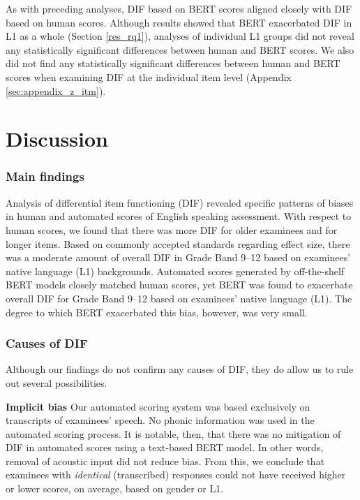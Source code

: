 \documentclass [PhD] {uclathes}
\begin{document}
As with preceding analyses, DIF based on BERT scores aligned closely with DIF based on human scores. Although results showed that BERT exacerbated DIF in L1 as a whole (Section \ref{res_rq1}), analyses of individual L1 groups did not reveal any statistically significant differences between human and BERT scores. We also did not find any statistically significant differences between human and BERT scores when examining DIF at the individual item level (Appendix \ref{sec:appendix_z_itm}). 

\chapter{Discussion}

\subsection{Main findings}

Analysis of differential item functioning (DIF) revealed specific patterns of biases in human and automated scores of English speaking assessment. With respect to human scores, we found that there was more DIF for older examinees and for longer items. Based on commonly accepted standards regarding effect size, there was a moderate amount of overall DIF in Grade Band 9–12 based on examinees’ native language (L1) backgrounds. Automated scores generated by off-the-shelf BERT models closely matched human scores, yet BERT was found to exacerbate overall DIF for Grade Band 9–12 based on examinees’ native language (L1). The degree to which BERT exacerbated this bias, however, was very small.

\subsection{Causes of DIF}

Although our findings do not confirm any causes of DIF, they do allow us to rule out several possibilities. 

\noindent \textbf{Implicit bias} \;
Our automated scoring system was based exclusively on transcripts of examinees’ speech. No phonic information was used in the automated scoring process. It is notable, then, that there was no mitigation of DIF in automated scores using a text-based BERT model. In other words, removal of acoustic input did not reduce bias. From this, we conclude that examinees with \emph{identical} (transcribed) responses could not have received higher or lower scores, on average, based on gender or L1. 
\end{document}

